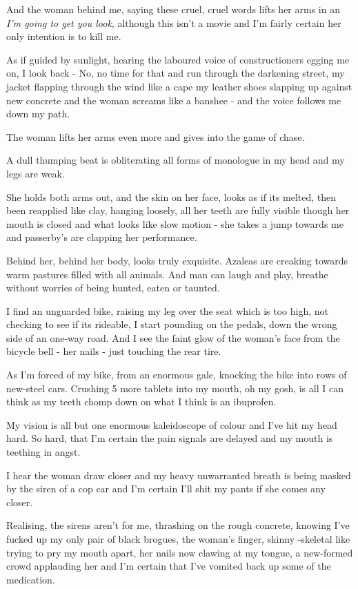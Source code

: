 \documentclass[19pt,openany]{book}
\begin{document}
And the woman behind me,
saying these cruel, cruel words
lifts her arms in an
\textit{I'm going to get you
look}, although this isn't
a movie and I'm fairly
certain her only intention
is to kill me.

As if guided by sunlight, hearing
the laboured voice of constructioners
egging me on, I look back - No, no time for that
and run through the darkening
street, my jacket flapping through the
wind like a cape my leather shoes slapping up
against new concrete and the woman
screams like a banshee - and the
voice follows me down my path.

The woman lifts her arms
even more
and gives into the game
of chase.

A dull thumping beat
is obliterating all
forms of monologue in
my head and my legs
are weak.

She holds both arms out,
and the skin on her
face, looks as if its
melted, then been reapplied
like clay, hanging loosely,
all her teeth are fully
visible though her mouth is
closed and what looks like slow
motion - she takes a jump
towards me and passerby's
are clapping her performance.

Behind her, behind
her body, looks
truly exquisite.
Azaleas are
creaking towards warm
pastures filled
with all animals.
And man
can laugh and play,
breathe without worries
of being hunted, eaten or taunted.

I find an unguarded bike,
raising my leg over the
seat which is too high,
not checking to
see if its rideable,
I start pounding on the
pedals, down the wrong side
of an one-way road.
And I see the faint glow
of the woman's face from the
bicycle bell - her nails - just
touching the rear tire.

As I'm forced of my bike, from an enormous
gale, knocking the bike into rows of new-steel
cars. Crushing 5 more tablets into my mouth,
oh my gosh, is all I can think as my teeth
chomp down on what I think is an ibuprofen.

My vision is all but one
enormous kaleidoscope of colour
and I've hit my head hard. So
hard, that I'm certain the pain
signals are delayed and my mouth
is teething in angst.

I hear the woman draw
closer and my heavy unwarranted
breath is being masked by the siren
of a cop car and I'm certain I'll shit
my pants if she comes any closer.

Realising, the sirens aren't
for me, thrashing on the rough concrete,
knowing I've fucked up my only pair
of black brogues, the woman's finger,
skinny -skeletal like
trying to pry my mouth apart,
her nails now clawing at
my tongue, a new-formed crowd applauding
her and I'm certain that I've vomited
back up some of the medication.
\end{document}
